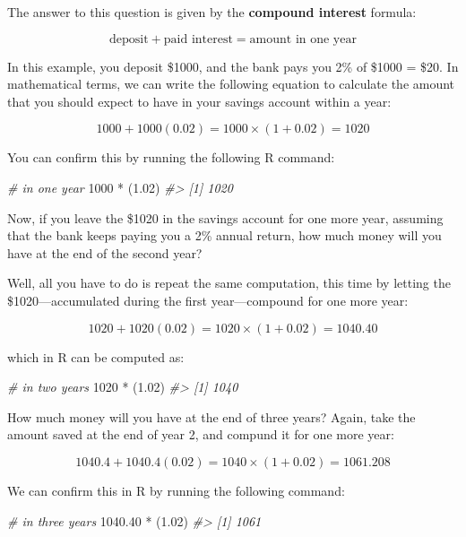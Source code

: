 \documentclass[
]{book}
\newenvironment{Shaded}{\begin{snugshade}}{\end{snugshade}}
\newcommand{\CommentTok}[1]{\textcolor[rgb]{0.56,0.35,0.01}{\textit{#1}}}
\newcommand{\DecValTok}[1]{\textcolor[rgb]{0.00,0.00,0.81}{#1}}
\newcommand{\FloatTok}[1]{\textcolor[rgb]{0.00,0.00,0.81}{#1}}
\newcommand{\NormalTok}[1]{#1}
\newcommand{\SpecialCharTok}[1]{\textcolor[rgb]{0.00,0.00,0.00}{#1}}
\begin{document}
The answer to this question is given by the \textbf{compound interest} formula:

\[
\text{deposit} + \text{paid interest} = \text{amount in one year}
\]

In this example, you deposit \$1000, and the bank pays you 2\% of \$1000 = \$20.
In mathematical terms, we can write the following equation to calculate the
amount that you should expect to have in your savings account within a year:

\[
1000 + 1000 (0.02) = 1000 \times (1 + 0.02) = 1020
\]

You can confirm this by running the following R command:

\begin{Shaded}
\begin{Highlighting}[]
\CommentTok{\# in one year}
\DecValTok{1000} \SpecialCharTok{*}\NormalTok{ (}\FloatTok{1.02}\NormalTok{)}
\CommentTok{\#\textgreater{} [1] 1020}
\end{Highlighting}
\end{Shaded}

Now, if you leave the \$1020 in the savings account for one more year, assuming
that the bank keeps paying you a 2\% annual return, how much money will you have
at the end of the second year?

Well, all you have to do is repeat the same computation, this time by letting
the \$1020---accumulated during the first year---compound for one more year:

\[
1020 + 1020 (0.02) = 1020 \times (1 + 0.02) = 1040.40
\]

which in R can be computed as:

\begin{Shaded}
\begin{Highlighting}[]
\CommentTok{\# in two years}
\DecValTok{1020} \SpecialCharTok{*}\NormalTok{ (}\FloatTok{1.02}\NormalTok{)}
\CommentTok{\#\textgreater{} [1] 1040}
\end{Highlighting}
\end{Shaded}

How much money will you have at the end of three years? Again, take the amount
saved at the end of year 2, and compund it for one more year:

\[
1040.4 + 1040.4 (0.02) = 1040 \times (1 + 0.02) = 1061.208
\]

We can confirm this in R by running the following command:

\begin{Shaded}
\begin{Highlighting}[]
\CommentTok{\# in three years}
\FloatTok{1040.40} \SpecialCharTok{*}\NormalTok{ (}\FloatTok{1.02}\NormalTok{)}
\CommentTok{\#\textgreater{} [1] 1061}
\end{Highlighting}
\end{Shaded}
\end{document}
